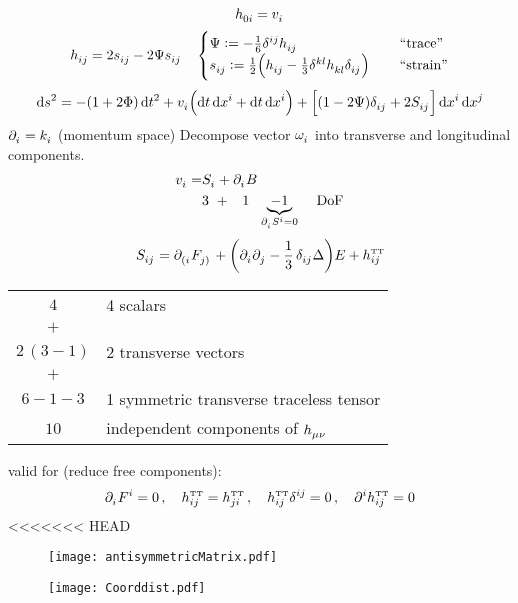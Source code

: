 \begin{equation}
    \tensor{h}{_{0i}} = \tensor{v}{_i}
\end{equation}
\begin{equation}
    \tensor{h}{_{ij}} = 2\tensor{s}{_{ij}} - 2\Psi\tensor{s}{_{ij}}\,\quad
    \begin{cases}
\Psi := -\frac{1}{6}\tensor{\delta}{^{ij}}\tensor{h}{_{ij}}\,\quad
&\text{``trace''} \\
\tensor{s}{_{ij}} := \frac{1}{2} \left(\tensor{h}{_{ij}} - \frac{1}{3}\tensor{\delta}{^{kl}}\tensor{h}{_{kl}}\tensor{\delta}{_{ij}}\right)\,\quad &\text{``strain''}
\end{cases}
\end{equation}
\begin{equation}
    \dif s^2 = -\left(1+2\Phi\right)\dif t^2 + \tensor{v}{_i} \left(\dif t \dif \tensor{x}{^i} + \dif t \dif \tensor{x}{^i}\right) + \left[\left(1-2\Psi\right)\tensor{\delta}{_{ij}} + 2 \tensor{S}{_{ij}} \right]\dif \tensor{x}{^i}\dif \tensor{x}{^j}
\end{equation}
$\tensor{\partial}{_i} = \tensor{k}{_i}$ (momentum space)
Decompose vector $\tensor{\omega}{_i}$ into transverse and longitudinal components.
\begin{align}
    \tensor{v}{_i} = &\tensor{S}{_i} + \tensor{\partial}{_i}B\\
    &3\,\,+\,\,\,\,\,1\,\,\,\,\underbrace{-1}_{\tensor{\partial}{_i}\tensor{S}{^i}=0}\,\quad \text{DoF}
\end{align}
\begin{equation}
    \tensor{S}{_{ij}} = \tensor{\partial}{_{(i}}\tensor{F}{_{j)}} + \left( \tensor{\partial}{_i}\tensor{\partial}{_j} - \frac{1}{3}\,\tensor{\delta}{_{ij}}\Delta\right) E + \tensor*{h}{_{ij}^{\text{\tiny TT}}}
\end{equation}
\begin{center}
    \begin{tabular}{c l}
        $4$ & 4 scalars \\
        $+$ & \\
        $2\,(3-1)$ & 2 transverse vectors \\
        $+$ & \\
        $6-1-3$ & 1 symmetric transverse traceless tensor \\
        \midrule
        $10$ & independent components of $\tensor{h}{_{\mu\nu}}$
    \end{tabular}
\end{center}
valid for (reduce free components):
\begin{equation}
    \tensor{\partial}{_i}\tensor{F}{^i}=0\,,\quad\tensor*{h}{_{ij}^{\text{\tiny TT}}}=\tensor*{h}{_{ji}^{\text{\tiny TT}}}\,,\quad\tensor*{h}{_{ij}^{\text{\tiny TT}}}\tensor{\delta}{^{ij}}=0\,,\quad\tensor{\partial}{^i}\tensor*{h}{_{ij}^{\text{\tiny TT}}}=0
\end{equation}
<<<<<<< HEAD
\begin{figure}[hbtp!]
\centering
 \texttt{[image: antisymmetricMatrix.pdf]}
\caption{}
\end{figure}
\begin{figure}[hbtp!]
\centering
 \texttt{[image: Coorddist.pdf]}
\caption{}
\end{figure}

